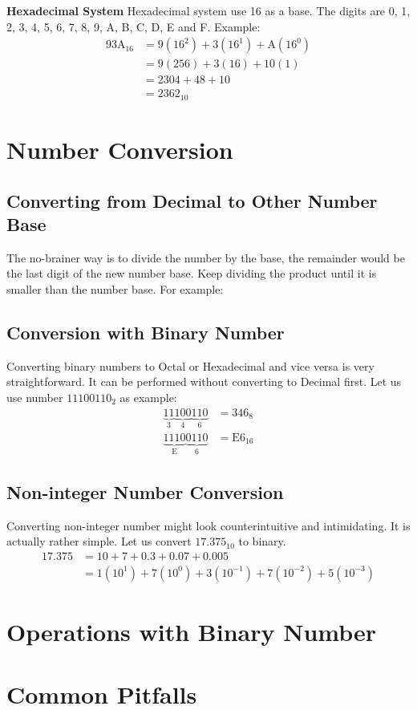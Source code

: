 \noindent\large\textbf{Hexadecimal System}\newline
\normalsize Hexadecimal system use 16 as a base. The digits are 0, 1, 2, 3, 4, 5, 6, 7, 8, 9, A, B, C, D, E and F. Example:
\begin{equation} \label{eq4}
\begin{split}
93\text{A}_{16} & = 9(16^2)+3(16^1)+\text{A}(16^0) \\
& = 9(256)+3(16)+10(1) \\
& = 2304+48+10 \\
& = 2362_{10}
\end{split}
\end{equation} 

\section{Number Conversion}
\subsection{Converting from Decimal to Other Number Base}
\noindent The no-brainer way is to divide the number by the base, the remainder would be the last digit of the new number base. Keep dividing the product until it is smaller than the number base. For example:






\subsection{Conversion with Binary Number}
\noindent Converting binary numbers to Octal or Hexadecimal and vice versa is very straightforward. It can be performed without converting to Decimal first. Let us use number $11100110_2$ as example:
\begin{equation} \label{eq5}
\begin{split}
\underbrace{11}_\text{3}\underbrace{100}_\text{4}\underbrace{110}_\text{6} & = 346_8\\
\underbrace{1110}_\text{E}\underbrace{0110}_\text{6} & = \text{E}6_{16}
\end{split}
\end{equation}
\subsection{Non-integer Number Conversion}
Converting non-integer number might look counterintuitive and intimidating. It is actually rather simple. Let us convert $17.375_{10}$ to binary.
\[\begin{split}
17.375 & = 10 + 7 + 0.3+0.07+0.005 \\
& = 1(10^1) + 7(10^0) + 3(10^{-1}) + 7(10^{-2})+5(10^{-3})
\end{split}\]

\section{Operations with Binary Number}
\section{Common Pitfalls}